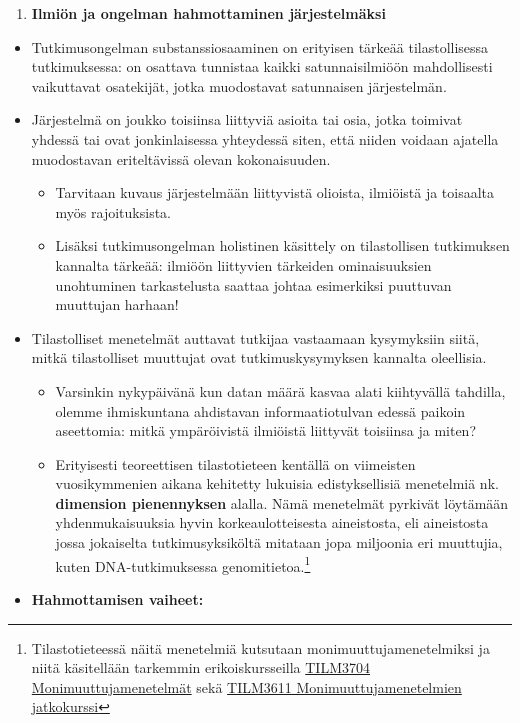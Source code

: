 \documentclass[
]{book}
\providecommand{\tightlist}{%
  \setlength{\itemsep}{0pt}\setlength{\parskip}{0pt}}
\begin{document}
\begin{enumerate}
\def\labelenumi{\arabic{enumi}.}
\setcounter{enumi}{1}
\tightlist
\item
  \textbf{Ilmiön ja ongelman hahmottaminen järjestelmäksi}
\end{enumerate}

\begin{itemize}
\tightlist
\item
  Tutkimusongelman substanssiosaaminen on erityisen tärkeää tilastollisessa tutkimuksessa: on osattava tunnistaa kaikki satunnaisilmiöön mahdollisesti vaikuttavat osatekijät, jotka muodostavat satunnaisen järjestelmän.
\item
  Järjestelmä on joukko toisiinsa liittyviä asioita tai osia, jotka toimivat yhdessä tai ovat
  jonkinlaisessa yhteydessä siten, että niiden voidaan ajatella muodostavan eriteltävissä olevan kokonaisuuden.

  \begin{itemize}
  \tightlist
  \item
    Tarvitaan kuvaus järjestelmään liittyvistä olioista, ilmiöistä ja toisaalta myös rajoituksista.
  \item
    Lisäksi tutkimusongelman holistinen käsittely on tilastollisen tutkimuksen kannalta tärkeää: ilmiöön liittyvien tärkeiden ominaisuuksien unohtuminen tarkastelusta saattaa johtaa esimerkiksi puuttuvan muuttujan harhaan!
  \end{itemize}
\item
  Tilastolliset menetelmät auttavat tutkijaa vastaamaan kysymyksiin siitä, mitkä tilastolliset muuttujat ovat tutkimuskysymyksen kannalta oleellisia.

  \begin{itemize}
  \tightlist
  \item
    Varsinkin nykypäivänä kun datan määrä kasvaa alati kiihtyvällä tahdilla, olemme ihmiskuntana ahdistavan informaatiotulvan edessä paikoin aseettomia: mitkä ympäröivistä ilmiöistä liittyvät toisiinsa ja miten?
  \item
    Erityisesti teoreettisen tilastotieteen kentällä on viimeisten vuosikymmenien aikana kehitetty lukuisia edistyksellisiä menetelmiä nk. \textbf{dimension pienennyksen} alalla. Nämä menetelmät pyrkivät löytämään yhdenmukaisuuksia hyvin korkeaulotteisesta aineistosta, eli aineistosta jossa jokaiselta tutkimusyksiköltä mitataan jopa miljoonia eri muuttujia, kuten DNA-tutkimuksessa genomitietoa.\footnote{Tilastotieteessä näitä menetelmiä kutsutaan monimuuttujamenetelmiksi ja niitä käsitellään tarkemmin erikoiskursseilla \href{https://opas.peppi.utu.fi/fi/opintojakso/TILM3704/90801}{TILM3704 Monimuuttujamenetelmät} sekä \href{https://opas.peppi.utu.fi/fi/opintojakso/TILM3611/91182}{TILM3611 Monimuuttujamenetelmien jatkokurssi}}
  \end{itemize}
\item
  \textbf{Hahmottamisen vaiheet:}


\end{itemize}
\end{document}
